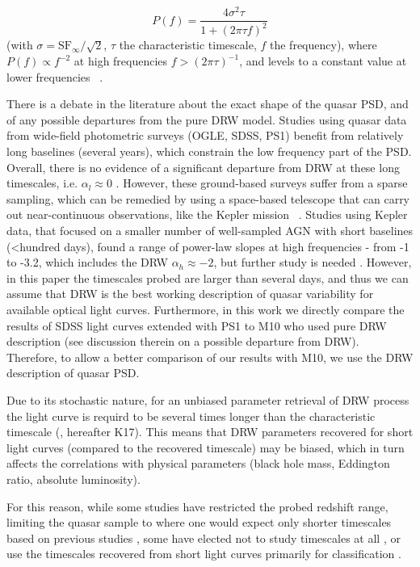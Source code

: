 \documentclass[twocolumn]{aastex62}
\begin{document}
\begin{equation}
	P(f) = \frac{4\sigma^{2}\tau}{1+(2 \pi \tau f)^{2}}
\end{equation}
(with $\sigma = \mathrm{SF}_{\infty} / \sqrt{2}$, $\tau$ the characteristic timescale, $f$ the frequency), where $P(f) \propto f^{-2}$  at high frequencies $f > (2\pi \tau)^{-1}$, and levels to a constant value at lower frequencies ~\citep{kelly2014}. 

There is a debate in the literature about the exact shape of the quasar PSD, and of any possible  departures from the pure DRW model. Studies using quasar data from wide-field photometric surveys (OGLE, SDSS, PS1) benefit from relatively long baselines (several years), which constrain the low frequency part of the PSD. Overall, there is no evidence of a significant departure from DRW at these long timescales, i.e. $\alpha_{l} \approx 0$ \citep{zu2013, simm2016, kozlowski2016b, caplar2017, guo2017, sun2018}. However, these ground-based surveys suffer from a sparse sampling, which can be remedied by using a space-based telescope that can carry out near-continuous observations, like the Kepler mission ~\citep{borucki2010}. Studies using Kepler data, that focused on a smaller number of well-sampled AGN with short baselines (<hundred days), found a range of power-law slopes at high frequencies - from -1 to -3.2, which includes the DRW $\alpha_{h} \approx -2$, but further study is needed \citep{mushotzky2011,edelson2014,aranzana2018,smith2018}. However, in this paper the timescales probed are larger than several days, and thus we can assume that DRW is the best working description of quasar variability for available optical light curves. Furthermore, in this work we directly compare the results of SDSS light curves extended with PS1 to M10 who used pure DRW description (see discussion therein on a possible departure from DRW). Therefore, to allow a better comparison of our results with M10, we  use the DRW description of quasar PSD. 

Due to its stochastic nature, for an unbiased parameter retrieval of DRW process the light curve is requird to be several times longer than the characteristic timescale (\citealt{kozlowski2010, kozlowski2017a}, hereafter K17). This means that DRW parameters recovered for short light curves (compared to the recovered timescale) may be biased, which in turn affects the correlations with physical parameters (black hole mass, Eddington ratio, absolute luminosity). 

For this reason, while some studies have restricted the probed redshift range, limiting the quasar sample to where one would expect only shorter timescales based on previous studies \citep{sun2018, guo2017, kelly2013,simm2016}, some have elected not to study timescales at all \citep{sun2018,sanchez2018}, or use the timescales recovered from short light curves primarily for classification \citep{hernitschek2016}.
\end{document}
